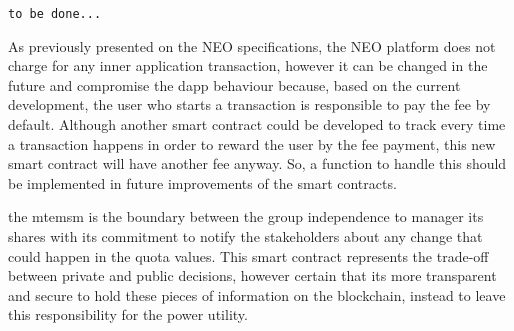 \verb|to be done...|




As previously presented on the NEO specifications, the NEO platform does not charge for any inner application transaction,
however it can be changed in the future and compromise the \gls{dapp} behaviour because, based on the current development, the user who starts a transaction is responsible to pay the fee by default.
Although another smart contract could be developed to track every time a transaction happens in order to reward the user by the fee payment, this new smart contract will have another fee anyway.
So, a function to handle this should be implemented in future improvements of the smart contracts.



the \gls{mtemsm} is the boundary between the group independence to manager its shares with its commitment to notify the stakeholders about any change that could happen in the quota values.
This smart contract represents the trade-off between private and public decisions, however certain that its more transparent and secure to hold these pieces of information on the blockchain, instead to leave this responsibility for the power utility.